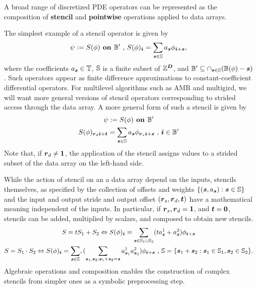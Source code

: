 \documentclass[12pt]{article}
\begin{document}
A broad range of discretized PDE operators can be represented as the composition of
\textbf{stencil} and \textbf{pointwise} operations applied to data arrays. 

The simplest example of a stencil operator is given by 
\begin{gather*}
\psi := S(\phi)  \hbox{\bf{ on }} \mathbb{B}' \hbox{ , } S(\phi)_{\boldsymbol{i}} = 
\sum \limits_{{\boldsymbol{s}} \in \mathbb{S}} a_{\boldsymbol{s}} \phi_{{\boldsymbol{i}} + {\boldsymbol{s}}},
\end{gather*}
where the coefficients $a_{\boldsymbol{s}} \in \mathbb{T}$, $\mathbb{S}$ is a finite subset of $\mathbb{Z}^{\boldsymbol{D}}$, and $\mathbb{B}' \subseteq \cap_{{\boldsymbol{s}} \in \mathbb{S}} (\mathbb{B}(\phi)- {\boldsymbol{s}})$. Such operators appear as finite difference approximations to constant-coefficient differential operators. For multilevel algorithms such as AMR and multigird, we will want more general versions of stencil operators corresponding to strided access through the data array. A more general form of such a stencil is given by
\begin{gather*}
\psi := S(\phi)  \hbox{\bf{ on }} \mathbb{B}' \\
 S(\phi)_{{\boldsymbol{r}}_{d} {\boldsymbol{i}} + {\boldsymbol{t}}} = 
\sum \limits_{{\boldsymbol{s}} \in \mathbb{S}} a_{\boldsymbol{s}} \phi_{{\boldsymbol{r}}_{s}{\boldsymbol{i}} + {\boldsymbol{s}}} \hbox{ , }
{\boldsymbol{i}} \in \mathbb{B}'
\end{gather*}
Note that, if ${\boldsymbol{r}}_d \neq {\boldsymbol{1}}$, the application of the stencil assigns values to a strided subset of the data array on the left-hand side. 

While the action of stencil on an a data array depend on the inputs, stencils themselves, as specified by the collection of offsets and weights $\{({\boldsymbol{s}},a_{\boldsymbol{s}}): {\boldsymbol{s}} \in \mathbb{S}\}$ and the input and output stride and output offset $({\boldsymbol{r}}_s, {\boldsymbol{r}}_d, {\boldsymbol{t}})$ have a mathematical meaning independent of the inputs. In particular, if ${\boldsymbol{r}}_s, {\boldsymbol{r}}_d = {\boldsymbol{1}}$, and ${\boldsymbol{t}} = {\boldsymbol{0}}$, stencils can be added, multiplied by scalars, and composed to obtain new stencils. 
\begin{gather*} 
S = t S_1 + S_2 \Leftrightarrow
S(\phi)_{\boldsymbol{i}} = \sum \limits_{{\boldsymbol{s}} \in \mathbb{S}_1 \cup \mathbb{S}_2} 
(t a^1_{{\boldsymbol{s}}} + a^2_{{\boldsymbol{s}}}) \phi_{{\boldsymbol{i}} + {\boldsymbol{s}}} \\
S = S_1 \cdot S_2 \Leftrightarrow S (\phi)_{\boldsymbol{i}} = \sum \limits_{{\boldsymbol{s}}\in \mathbb{S} } ,
(\sum \limits_{{\boldsymbol{s}}_1,{\boldsymbol{s}}_2: {\boldsymbol{s}}_1 + {\boldsymbol{s}}_2 = {\boldsymbol{s}}} a^1_{{\boldsymbol{s}}_1}  a^2_{{\boldsymbol{s}}_2} ) \phi_{{\boldsymbol{i}} + {\boldsymbol{s}}} \hbox{ , } \mathbb{S} = \{{\boldsymbol{s}}_1 + {\boldsymbol{s}}_2: {\boldsymbol{s}}_1 \in \mathbb{S}_1 , {\boldsymbol{s}}_2 \in \mathbb{S}_2\}.
\end{gather*}
Algebraic operations and composition enables the construction of complex stencils from simpler ones as a symbolic preprocessing step.
\end{document}
